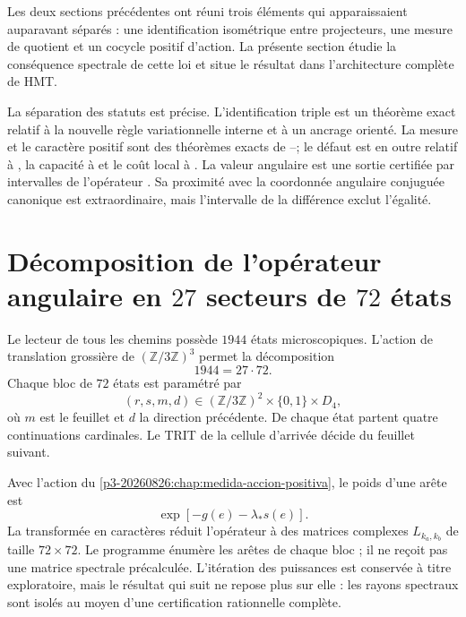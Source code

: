 \label{p3-20260826:chap:operador-angular-dictamen}

Les deux sections précédentes ont réuni trois éléments qui apparaissaient auparavant
séparés : une identification isométrique entre projecteurs, une mesure de
quotient et un cocycle positif d’action. La présente section étudie la conséquence
spectrale de cette loi et situe le résultat dans l’architecture complète
de HMT\@.

La séparation des statuts est précise. L’identification triple est un théorème
exact relatif à la nouvelle règle variationnelle interne et à un ancrage orienté.
La mesure et le caractère positif sont des théorèmes exacts de \HTr--\HAdd ; le défaut
est en outre relatif à \HDef, la capacité à \HRes et le coût local à \HLoc. La valeur
angulaire est une sortie certifiée par intervalles de l’opérateur \Gtr. Sa
proximité avec la coordonnée angulaire conjuguée canonique est extraordinaire, mais l’intervalle de
la différence exclut l’égalité.

\section{Décomposition de l’opérateur angulaire en \(27\) secteurs de \(72\) états}

Le lecteur de tous les chemins \Gtr possède \(1944\) états microscopiques.
L’action de translation grossière de \((\mathbb Z/3\mathbb Z)^3\) permet la
décomposition
\[
 1944=27\cdot72.
\]
Chaque bloc de \(72\) états est paramétré par
\[
 (r,s,m,d)
 \in(\mathbb Z/3\mathbb Z)^2\times\{0,1\}\times D_4,
\]
où \(m\) est le feuillet et \(d\) la direction précédente. De chaque état
partent quatre continuations cardinales. Le TRIT de la cellule d’arrivée
décide du feuillet suivant.

Avec l’action du \cref{p3-20260826:chap:medida-accion-positiva}, le poids d’une arête
est
\[
 \exp[-g(e)-\lambda_*s(e)].
\]
La transformée en caractères réduit l’opérateur à des matrices complexes
\(L_{k_a,k_b}\) de taille \(72\times72\). Le programme énumère les
arêtes de chaque bloc ; il ne reçoit pas une matrice spectrale précalculée.
L’itération des puissances est conservée à titre exploratoire, mais le résultat qui
suit ne repose plus sur elle : les rayons spectraux sont isolés au moyen d’une
certification rationnelle complète.

